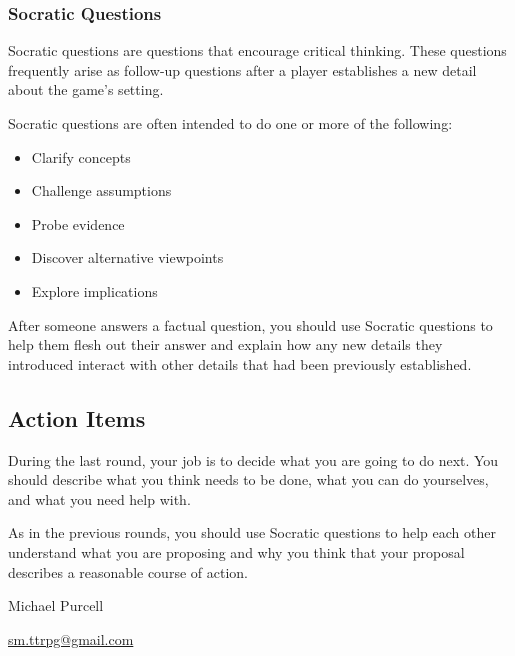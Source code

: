 \documentclass[a6paper, 11pt, parskip=half, DIV=15]{scrartcl}
\begin{document}
\newpage
\enlargethispage{3.5\baselineskip}

\subsubsection*{Socratic Questions}
Socratic questions are questions that encourage critical thinking.
These questions frequently arise as follow-up questions after a player establishes a new detail about the game's setting.

Socratic questions are often intended to do one or more of the following:
\begin{itemize}[nosep]
	\item Clarify concepts
	\item Challenge assumptions
	\item Probe evidence
	\item Discover alternative viewpoints
	\item Explore implications
\end{itemize}

After someone answers a factual question, you should use Socratic questions to help them flesh out their answer and explain how any new details they introduced interact with other details that had been previously established.

\newpage
\enlargethispage{1.75\baselineskip}

\subsection*{Action Items}
During the last round, your job is to decide what you are going to do next.
You should describe what you think needs to be done, what you can do yourselves, and what you need help with.

As in the previous rounds, you should use Socratic questions to help each other understand what you are proposing and why you think that your proposal describes a reasonable course of action.

\vfill
\begin{center}
\end{center}
\vfill
\begin{description}[nosep]
\item[\textbf{Design}:] Michael Purcell \\
\item[\textbf{Contact}:] \href{mailto:sm.ttrpg@gmail.com}{sm.ttrpg@gmail.com}\\
\item[\textbf{License}:] \doclicenseText%
\end{description}
\end{document}

